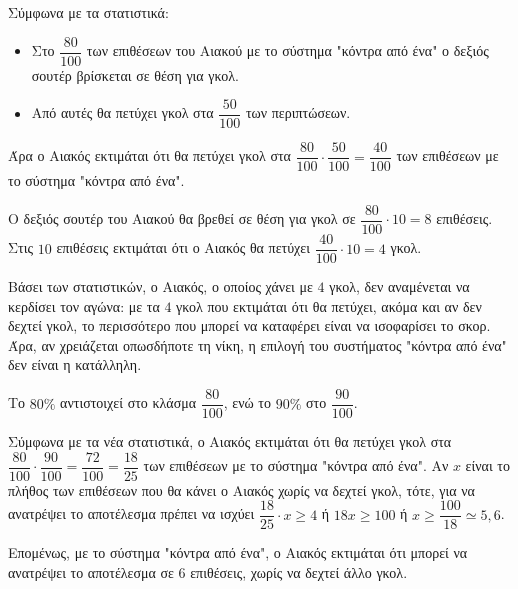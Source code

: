 
\begin{alist}
\item
\begin{rlist}
\item Σύμφωνα με τα στατιστικά:
\begin{itemize}
\item Στο $\dfrac{80}{100}$ των επιθέσεων του Αιακού με το σύστημα "κόντρα από ένα" ο δεξιός
σουτέρ βρίσκεται σε θέση για γκολ.
\item Από αυτές θα πετύχει γκολ στα $\dfrac{50}{100}$ των περιπτώσεων.
\end{itemize}

Άρα ο Αιακός εκτιμάται ότι θα πετύχει γκολ στα $\dfrac{80}{100} \cdot \dfrac{50}{100} = \dfrac{40}{100}$ των επιθέσεων με το σύστημα
"κόντρα από ένα".

\item Ο δεξιός σουτέρ του Αιακού θα βρεθεί σε θέση για γκολ σε $\dfrac{80}{100} \cdot 10 = 8$ επιθέσεις.
Στις $10$ επιθέσεις εκτιμάται ότι ο Αιακός θα πετύχει $\dfrac{40}{100} \cdot 10 = 4$ γκολ.

\item Βάσει των στατιστικών, ο Αιακός, ο οποίος χάνει με $4$ γκολ, δεν αναμένεται να
κερδίσει τον αγώνα: με τα $4$ γκολ που εκτιμάται ότι θα πετύχει, ακόμα και αν δεν δεχτεί
γκολ, το περισσότερο που μπορεί να καταφέρει είναι να ισοφαρίσει το σκορ. Άρα, αν
χρειάζεται οπωσδήποτε τη νίκη, η επιλογή του συστήματος "κόντρα από ένα" δεν είναι
η κατάλληλη.
\end{rlist}

\item Το $80\%$ αντιστοιχεί στο κλάσμα $\dfrac{80}{100}$, ενώ το $90\%$ στο $\dfrac{90}{100}$.

Σύμφωνα με τα νέα στατιστικά, ο Αιακός εκτιμάται ότι θα πετύχει γκολ στα $\dfrac{80}{100} \cdot \dfrac{90}{100} = \dfrac{72}{100} = \dfrac{18}{25}$
των επιθέσεων με το σύστημα "κόντρα από ένα".
Αν $x$ είναι το πλήθος των επιθέσεων που θα κάνει ο Αιακός χωρίς να δεχτεί γκολ, τότε, για
να ανατρέψει το αποτέλεσμα πρέπει να ισχύει $\dfrac{18}{25} \cdot x \ge 4$ ή $18x \ge 100$ ή $x \ge \dfrac{100}{18} \simeq 5,6$.

Επομένως, με το σύστημα "κόντρα από ένα", ο Αιακός εκτιμάται ότι μπορεί να ανατρέψει
το αποτέλεσμα σε $6$ επιθέσεις, χωρίς να δεχτεί άλλο γκολ.
\end{alist}

